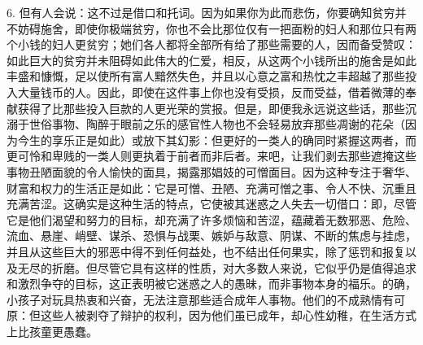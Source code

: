 6. 但有人会说：这不过是借口和托词。因为如果你为此而悲伤，你要确知贫穷并不妨碍施舍，即使你极端贫穷，你也不会比那位仅有一把面粉的妇人和那位只有两个小钱的妇人更贫穷；她们各人都将全部所有给了那些需要的人，因而备受赞叹：如此巨大的贫穷并未阻碍如此伟大的仁爱，相反，从这两个小钱所出的施舍是如此丰盛和慷慨，足以使所有富人黯然失色，并且以心意之富和热忱之丰超越了那些投入大量钱币的人。因此，即使在这件事上你也没有受损，反而受益，借着微薄的奉献获得了比那些投入巨款的人更光荣的赏报。但是，即便我永远说这些话，那些沉溺于世俗事物、陶醉于眼前之乐的感官性人物也不会轻易放弃那些凋谢的花朵（因为今生的享乐正是如此）或放下其幻影：但更好的一类人的确同时紧握这两者，而更可怜和卑贱的一类人则更执着于前者而非后者。来吧，让我们剥去那些遮掩这些事物丑陋面貌的令人愉快的面具，揭露那娼妓的可憎面目。因为这种专注于奢华、财富和权力的生活正是如此：它是可憎、丑陋、充满可憎之事、令人不快、沉重且充满苦涩。这确实是这种生活的特点，它使被其迷惑之人失去一切借口：即，尽管它是他们渴望和努力的目标，却充满了许多烦恼和苦涩，蕴藏着无数邪恶、危险、流血、悬崖、峭壁、谋杀、恐惧与战栗、嫉妒与敌意、阴谋、不断的焦虑与挂虑，并且从这些巨大的邪恶中得不到任何益处，也不结出任何果实，除了惩罚和报复以及无尽的折磨。但尽管它具有这样的性质，对大多数人来说，它似乎仍是值得追求和激烈争夺的目标，这正表明被它迷惑之人的愚昧，而非事物本身的福乐。的确，小孩子对玩具热衷和兴奋，无法注意那些适合成年人事物。他们的不成熟情有可原：但这些人被剥夺了辩护的权利，因为他们虽已成年，却心性幼稚，在生活方式上比孩童更愚蠢。\par

